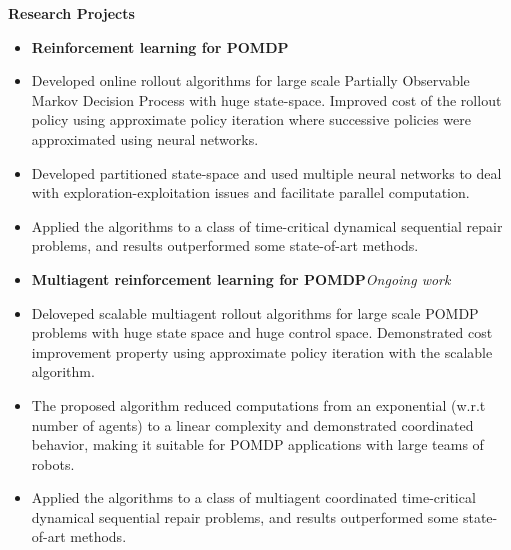 \documentclass[a4paper,11pt]{article}
\newcommand{\resheading}[1]{{\small \colorbox{mygrey}{\begin{minipage}{0.975\textwidth}{\textbf{#1 \vphantom{p\^{E}}}}\end{minipage}}}}
\begin{document}
	\resheading{\textbf{\large Research Projects}}
	\begin{description}
		\item 
		\begin{itemize}
			\item\textbf{Reinforcement learning for POMDP}
			\item Developed online rollout algorithms for large scale Partially Observable Markov Decision Process with huge state-space. Improved cost of the rollout policy using approximate policy iteration where successive policies were approximated using neural networks.
			\item Developed partitioned state-space and used multiple neural networks to deal with exploration-exploitation issues and facilitate parallel computation.
			\item Applied the algorithms to a class of time-critical dynamical sequential repair problems, and results outperformed some state-of-art methods.
			
		\end{itemize}
		\item 
		\begin{itemize}
			\item\textbf{Multiagent reinforcement learning for POMDP}\hfill \textit{Ongoing work}
			\item Deloveped scalable multiagent rollout algorithms for large scale POMDP problems with huge state space and huge control space. Demonstrated cost improvement property using approximate policy iteration with the scalable algorithm.
			\item The proposed algorithm reduced computations from an exponential (w.r.t number of agents) to a linear complexity and demonstrated coordinated behavior, making it suitable for POMDP applications with large teams of robots.
			\item Applied the algorithms to a class of multiagent coordinated time-critical dynamical sequential repair problems, and results outperformed some state-of-art methods.
			
			
		\end{itemize}
	\end{description}
	
\end{document}
